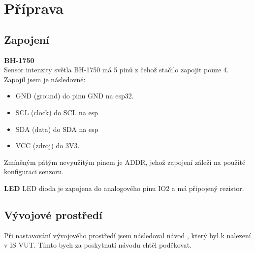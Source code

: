 \documentclass[a4paper, 11pt]{article}
\begin{document}
	\section{Příprava}


        \subsection{Zapojení}
	   \textbf{BH-1750} \\
            Sensor intenzity světla BH-1750 má 5 pinů z čehož stačilo zapojit pouze 4. Zapojil jsem je následovně:
            \begin{itemize}
                \item GND (ground) do pinu GND na esp32.
                \item SCL (clock) do SCL na esp
                \item SDA (data) do SDA na esp
                \item VCC (zdroj) do 3V3.
            \end{itemize}
            Zmíněným pátým nevyužitým pinem je ADDR, jehož zapojení záleží na použité konfiguraci senzoru.
            
          \vspace{6pt}
          \textbf{LED} \newline
          LED dioda je zapojena do analogového pinu IO2 a má připojený rezistor.
 
        \subsection{Vývojové prostředí}
        Při nastavování vývojového prostředí jsem následoval návod \cite{instalace_navod}, který byl k nalezení v
        IS VUT. Tímto bych za poskytnutí návodu chtěl poděkovat.

 
\end{document}

